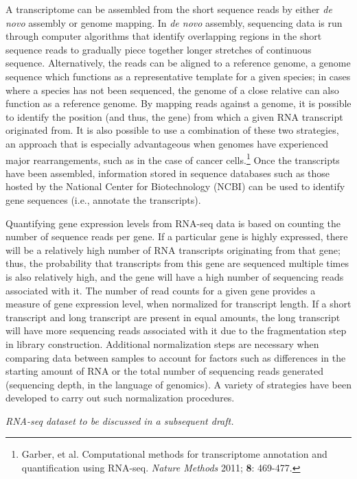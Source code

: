 A transcriptome can be assembled from the short sequence reads by either \textit{de novo} assembly or genome mapping. In \textit{de novo} assembly, sequencing data is run through computer algorithms that identify overlapping regions in the short sequence reads to gradually piece together longer stretches of continuous sequence.  Alternatively, the reads can be aligned to a reference genome, a genome sequence which functions as a representative template for a given species; in cases where a species has not been sequenced, the genome of a close relative can also function as a reference genome. By mapping reads against a genome, it is possible to identify the position (and thus, the gene) from which a given RNA transcript originated from. It is also possible to use a combination of these two strategies, an approach that is especially advantageous when genomes have experienced major rearrangements, such as in the case of cancer cells.\footnote{Garber, et al. Computational methods for transcriptome annotation and quantification using RNA-seq. \textit{Nature Methods} 2011; \textbf{8}: 469-477.} Once the transcripts have been assembled, information stored in sequence databases such as those hosted by the National Center for Biotechnology (NCBI) can be used to identify gene sequences (i.e., annotate the transcripts).

Quantifying gene expression levels from RNA-seq data is based on counting the number of sequence reads per gene. If a particular gene is highly expressed, there will be a relatively high number of RNA transcripts originating from that gene; thus, the probability that transcripts from this gene are sequenced multiple times is also relatively high, and the gene will have a high number of sequencing reads associated with it. The number of read counts for a given gene provides a measure of gene expression level, when normalized for transcript length. If a short transcript and long transcript are present in equal amounts, the long transcript will have more sequencing reads associated with it due to the fragmentation step in library construction. Additional normalization steps are necessary when comparing data between samples to account for factors such as differences in the starting amount of RNA or the total number of sequencing reads generated (sequencing depth, in the language of genomics). A variety of strategies have been developed to carry out such normalization procedures.

\textit{RNA-seq dataset to be discussed in a subsequent draft.}


